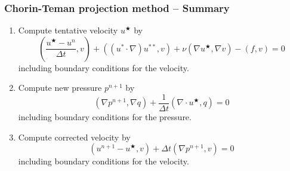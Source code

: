 \begin{frame}
  \frametitle{Chorin-Teman projection method -- Summary}
  \begin{enumerate}
  \item Compute tentative velocity $u^{\bigstar}$ by
    \begin{equation*}
       (\dfrac{u^{\bigstar} - u^{n}}{\Delta t},v)
      + ( (u^{\ast} \cdot \nabla)u^{\ast \ast},v)
      + \nu (\nabla u^{\bigstar}, \nabla v) - (f,v) = 0
    \end{equation*}
    including boundary conditions for the velocity.
  \item Compute new pressure $p^{n+1}$ by
    \begin{equation*}
      (\nabla p^{n+1},\nabla q) + \dfrac{1}{\Delta t} ( \nabla \cdot
      u^{\bigstar}, q) = 0
    \end{equation*}
    including boundary conditions for the pressure.
  \item Compute corrected velocity by
    \begin{equation*}
      (u^{n+1} - u^{\bigstar},v) + \Delta t (\nabla p^{n+1},v) = 0
    \end{equation*}
    including boundary conditions for the velocity.
  \end{enumerate}
\end{frame}

